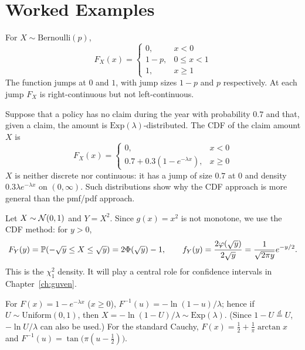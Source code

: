 \documentclass[main.tex]{subfiles}
\begin{document}
\section{Worked Examples}

\begin{example}
For $X\sim\text{Bernoulli}(p)$,
\[
F_X(x)=\begin{cases}0, & x<0\\ 1-p, & 0\le x<1\\ 1, & x\ge1\end{cases}
\]
The function jumps at $0$ and $1$, with jump sizes $1-p$ and $p$ respectively. At each jump $F_X$ is right-continuous but not left-continuous.
\end{example}

\begin{example}
Suppose that a policy has no claim during the year with probability $0.7$ and that, given a claim, the amount is $\text{Exp}(\lambda)$-distributed. The CDF of the claim amount $X$ is
\[
F_X(x)=\begin{cases}0,& x<0\\ 0.7+0.3(1-e^{-\lambda x}),& x\ge0\end{cases}
\]
$X$ is neither discrete nor continuous: it has a jump of size $0.7$ at $0$ and density $0.3\lambda e^{-\lambda x}$ on $(0,\infty)$. Such distributions show why the CDF approach is more general than the pmf/pdf approach.
\end{example}

\begin{example}\label{ex:ki-kare-1}
Let $X\sim\Normal(0,1)$ and $Y=X^2$. Since $g(x)=x^2$ is not monotone, we use the CDF method: for $y>0$,
\[
F_Y(y)=\P(-\sqrt y\le X\le\sqrt y)=2\Phi(\sqrt y)-1,\qquad f_Y(y)=\frac{2\varphi(\sqrt y)}{2\sqrt y}=\frac{1}{\sqrt{2\pi y}}e^{-y/2}.
\]
This is the $\chi^2_1$ density. It will play a central role for confidence intervals in Chapter~\ref{ch:guven}.
\end{example}

\begin{example}
For $F(x)=1-e^{-\lambda x}$ ($x\ge0$), $F^{-1}(u)=-\ln(1-u)/\lambda$; hence if $U\sim\text{Uniform}(0,1)$, then $X=-\ln(1-U)/\lambda\sim\text{Exp}(\lambda)$. (Since $1-U\overset{d}{=}U$, $-\ln U/\lambda$ can also be used.)
For the standard Cauchy, $F(x)=\tfrac12+\tfrac1\pi\arctan x$ and $F^{-1}(u)=\tan\big(\pi(u-\tfrac12)\big)$.
\end{example}
\end{document}
